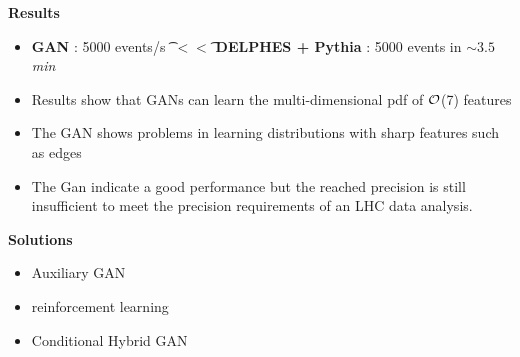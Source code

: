 \begin{frame}{\underline{\secname}}


\begin{center}
\textbf{Results}
\end{center}

\begin{itemize}			  \setlength\itemsep{0em}
\item \textbf{GAN} : 5000 events/s  \t{  } \textbf{{\Large $ <<  $}}\t{  }  \textbf{DELPHES + Pythia} : 5000 events in \textit{{$\sim 3.5$ min}}
\item
Results show that GANs can learn the multi-dimensional pdf of $\cal{O}$(7) features
\item
The GAN shows problems in learning distributions with sharp features such as edges
\item
The Gan indicate a good performance but the reached precision is still insufficient to meet the precision requirements of an LHC data analysis.
\end{itemize}

\begin{center}
\textbf{Solutions}
\end{center}
\begin{itemize}			  \setlength\itemsep{0em}
\item Auxiliary GAN
\item reinforcement learning

\item  Conditional Hybrid GAN


\end{itemize}
\end{frame}
%
%
%		
% 
%
%
%			
%
%		
%
%
%





